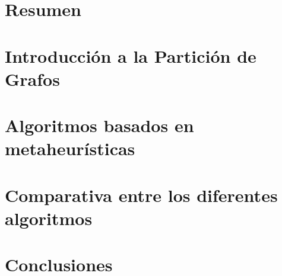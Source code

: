 \documentclass[a4paper,10pt,twoside]{report}
\author{\me}
\begin{document}


\normalsize

\chapter*{Resumen}\label{chapter:Resumen}
\setcounter{page}{0}


\tableofcontents

\chapter{Introducción a la Partición de Grafos}\label{chapter:Introduccion}


\chapter{Algoritmos basados en metaheurísticas}\label{chapter:Algoritmos}


\chapter{Comparativa entre los diferentes algoritmos}\label{chapter:Comparativa}


\chapter{Conclusiones}\label{chapter:Conclusiones}


\renewcommand{\bibname}{Bibliografia}


\end{document}
